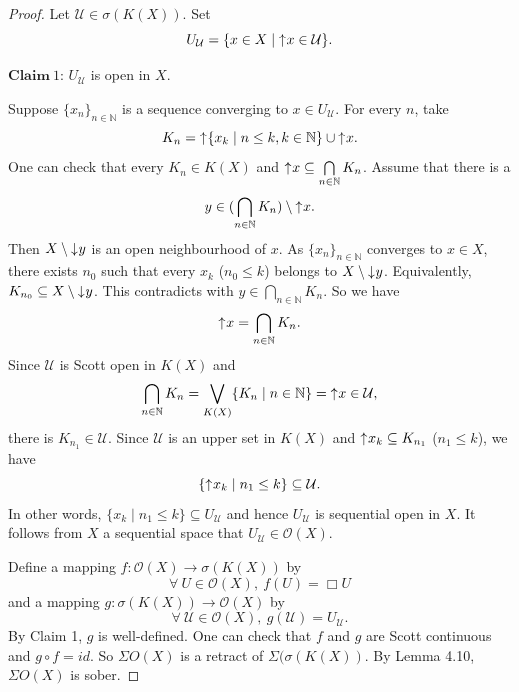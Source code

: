\documentclass[preprint,12pt]{elsarticle}
\numberwithin{equation}{section}
\newcommand{\dn}{\mathord{\downarrow}\hspace{0.05em}}
\newcommand{\up}{\mathord{\uparrow}\hspace{0.05em}}
\begin{document}
\begin{proof} Let $\mathcal{U}\in\sigma(K(X))$. Set $$U_{\mathcal{U}}=\{x\in X\mid \up x\in\mathcal{U}\}.$$

$\mathbf{Claim}\ 1$: $U_{\mathcal{U}}$ is open in $X$.

Suppose $\{x_{n}\}_{n\in \mathds{N}}$ is a sequence converging to $x\in U_{\mathcal{U}}$. For every $n$, take $$K_{n}=\up\{x_{k}\mid n\leq k, k\in\mathbb{N}\}\cup\up x.$$
One can check that every $K_{n}\in K(X)$ and $\up x\subseteq\bigcap\limits_{n\in\mathbb{N}}K_{n}$. Assume that there is a $$y\in(\bigcap\limits_{n\in\mathbb{N}}K_{n})\setminus\up x.$$ Then $X\setminus\dn y$ is an open neighbourhood of $x$. As $\{x_{n}\}_{n\in \mathds{N}}$ converges to $x\in X$, there exists $n_{0}$ such that every $x_{k}$ ($n_{0}\leq k$) belongs to $X\setminus\dn y$. Equivalently, $K_{n_{0}}\subseteq X\setminus\dn y$. This contradicts with $y\in\bigcap\limits_{n\in\mathbb{N}}K_{n}$. So we have $$\up x=\bigcap\limits_{n\in\mathbb{N}}K_{n}.$$ Since $\mathcal{U}$ is Scott open in $K(X)$ and
$$\bigcap\limits_{n\in\mathbb{N}}K_{n}=\bigvee\limits_{K(X)}\{K_{n}\mid n\in\mathbb{N}\}=\up x\in\mathcal{U},$$ there is $K_{n_{1}}\in\mathcal{U}$. Since $\mathcal{U}$ is an upper set in $K(X)$ and $\up x_{k}\subseteq K_{n_{1}}$ ($n_{1}\leq k$), we have $$\{\up x_{k}\mid n_{1}\leq k\}\subseteq \mathcal{U}.$$ In other words, $\{x_{k}\mid n_{1}\leq k\}\subseteq U_{\mathcal{U}}$ and hence $U_{\mathcal{U}}$ is sequential open in $X$. It follows from $X$ a sequential space that $U_{\mathcal{U}}\in\mathcal{O}(X)$.

Define a mapping $f:\mathcal{O}(X)\longrightarrow \sigma(K(X))$ by $$\forall\ U\in\mathcal{O}(X),\ f(U)=\Box U$$ and a mapping $g:\sigma(K(X))\longrightarrow\mathcal{O}(X)$ by $$\forall\ \mathcal{U}\in\mathcal{O}(X),\ g(\mathcal{U})=U_{\mathcal{U}}.$$
By Claim 1, $g$ is well-defined. One can check that $f$ and $g$ are Scott continuous and $g\circ f=id$. So $\Sigma O(X)$ is a retract of $\Sigma (\sigma(K(X))$. By Lemma 4.10, $\Sigma O(X)$ is sober. \end{proof}
\end{document}
